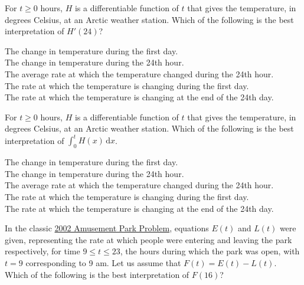 \begin{questions}
    \question For $t \geq 0$ hours, $H$ is a differentiable function of $t$ that gives the temperature, in degrees Celsius, at an Arctic weather station. Which of the following is the best interpretation of $H'(24)$? \\

    \begin{oneparchoices}
        \choice The change in temperature during the first day. \\[11pt]
        \makebox[0.035\textwidth] \choice The change in temperature during the 24th hour. \\[11pt]
        \makebox[0.035\textwidth] \choice The average rate at which the temperature changed during the 24th hour. \\[11pt]
        \makebox[0.035\textwidth] \choice The rate at which the temperature is changing during the first day. \\[11pt]
        \makebox[0.035\textwidth] \choice The rate at which the temperature is changing at the end of the 24th day.
    \end{oneparchoices} \par \horizontalline

    \question For $t \geq 0$ hours, $H$ is a differentiable function of $t$ that gives the temperature, in degrees Celsius, at an Arctic weather station. Which of the following is the best interpretation of $\int_0^t H(x) \,\mathrm{d}x$. \\

    \begin{oneparchoices}
        \choice The change in temperature during the first day. \\[11pt]
        \makebox[0.035\textwidth] \choice The change in temperature during the 24th hour. \\[11pt]
        \makebox[0.035\textwidth] \choice The average rate at which the temperature changed during the 24th hour. \\[11pt]
        \makebox[0.035\textwidth] \choice The rate at which the temperature is changing during the first day. \\[11pt]
        \makebox[0.035\textwidth] \choice The rate at which the temperature is changing at the end of the 24th day.
    \end{oneparchoices} \par \horizontalline

    \question In the classic \hyperlink{2002 Amusement Park Problem}{2002 Amusement Park Problem}, equations $E(t)$ and $L(t)$ were given, representing the rate at which people were entering and leaving the park respectively, for time $9 \leq t \leq 23$, the hours during which the park was open, with $t = 9$ corresponding to 9 am. Let us assume that $F(t) = E(t) - L(t)$. Which of the following is the best interpretation of $F(16)$? \\


\end{questions}
